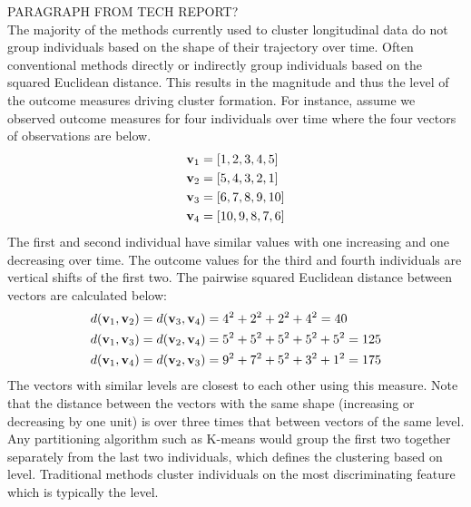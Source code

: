 PARAGRAPH FROM TECH REPORT?\\

The majority of the methods currently used to cluster longitudinal data do not group individuals based on the shape of their trajectory over time. Often conventional methods directly or indirectly group individuals based on the squared Euclidean distance. This results in the magnitude and thus the level of the outcome measures driving cluster formation. For instance, assume we observed outcome measures for four individuals over time where the four vectors of observations are below.
\begin{align*}
\mathbf v_{1}&=[1,2,3,4,5]\\
\mathbf v_{2}&=[5,4,3,2,1]\\
\mathbf v_{3}&=[6,7,8,9,10]\\
\mathbf v_{4}&=[10,9,8,7,6]
\end{align*}
The first and second individual have similar values with one increasing and one decreasing over time. The outcome values for the third and fourth individuals are vertical shifts of the first two. The pairwise squared Euclidean distance between vectors are calculated below:
\begin{align*}
d(\mathbf v_{1},\mathbf v_{2}) = d(\mathbf v_{3},\mathbf v_{4}) &= 4^{2}+2^{2}+2^{2}+4^{2} = 40\\
d(\mathbf v_{1},\mathbf v_{3}) = d(\mathbf v_{2},\mathbf v_{4}) &= 5^{2}+5^{2}+5^{2}+5^{2}+5^{2}=125\\
d(\mathbf v_{1},\mathbf v_{4}) = d(\mathbf v_{2},\mathbf v_{3}) &= 9^{2}+7^{2}+5^{2}+3^{2}+1^{2}=175
\end{align*}
The vectors with similar levels are closest to each other using this measure. Note that the distance between the vectors with the same shape (increasing or decreasing by one unit) is over three times that between vectors of the same level. Any partitioning algorithm such as K-means would group the first two together separately from the last two individuals, which defines the clustering based on level. Traditional methods cluster individuals on the most discriminating feature which is typically the level.\\

